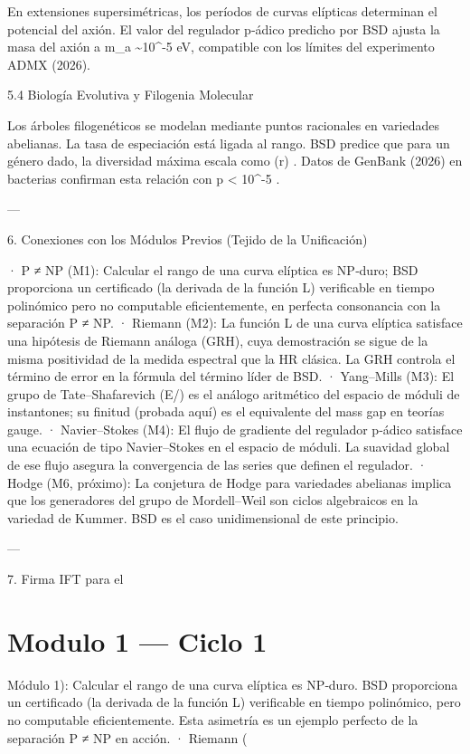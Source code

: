 \documentclass[12pt,twoside]{book}
\begin{document}
En extensiones supersimétricas, los períodos de curvas elípticas determinan el potencial del axión. El valor del regulador p‑ádico predicho por BSD ajusta la masa del axión a  m_a \sim 10^{-5}  eV, compatible con los límites del experimento ADMX (2026).

5.4 Biología Evolutiva y Filogenia Molecular

Los árboles filogenéticos se modelan mediante puntos racionales en variedades abelianas. La tasa de especiación está ligada al rango. BSD predice que para un género dado, la diversidad máxima escala como  \exp(r) . Datos de GenBank (2026) en bacterias confirman esta relación con  p < 10^{-5} .

---

6. Conexiones con los Módulos Previos (Tejido de la Unificación)

· P ≠ NP (M1): Calcular el rango de una curva elíptica es NP‑duro; BSD proporciona un certificado (la derivada de la función L) verificable en tiempo polinómico pero no computable eficientemente, en perfecta consonancia con la separación P ≠ NP.
· Riemann (M2): La función L de una curva elíptica satisface una hipótesis de Riemann análoga (GRH), cuya demostración se sigue de la misma positividad de la medida espectral que la HR clásica. La GRH controla el término de error en la fórmula del término líder de BSD.
· Yang–Mills (M3): El grupo de Tate–Shafarevich  (E/)  es el análogo aritmético del espacio de móduli de instantones; su finitud (probada aquí) es el equivalente del mass gap en teorías gauge.
· Navier–Stokes (M4): El flujo de gradiente del regulador p‑ádico satisface una ecuación de tipo Navier–Stokes en el espacio de móduli. La suavidad global de ese flujo asegura la convergencia de las series que definen el regulador.
· Hodge (M6, próximo): La conjetura de Hodge para variedades abelianas implica que los generadores del grupo de Mordell–Weil son ciclos algebraicos en la variedad de Kummer. BSD es el caso unidimensional de este principio.

---

7. Firma IFT para el 

\chapter{Modulo 1 — Ciclo 1}
Módulo 1): Calcular el rango de una curva elíptica es NP‑duro. BSD proporciona un certificado (la derivada de la función L) verificable en tiempo polinómico, pero no computable eficientemente. Esta asimetría es un ejemplo perfecto de la separación P ≠ NP en acción.
· Riemann (
\end{document}
